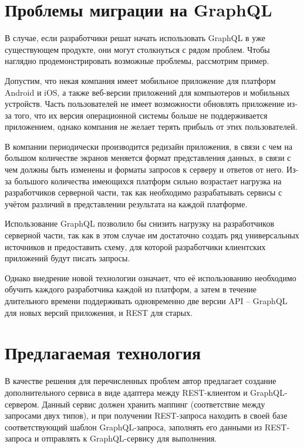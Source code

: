 \section{Проблемы миграции на GraphQL}\label{sec:migration-to-graphql}

В случае, если разработчики решат начать использовать GraphQL в уже существующем продукте, они могут столкнуться с рядом проблем.
Чтобы наглядно продемонстрировать возможные проблемы, рассмотрим пример.

Допустим, что некая компания имеет мобильное приложение для платформ Android и iOS, а также веб-версии приложений для компьютеров и мобильных устройств.
Часть пользователей не имеет возможности обновлять приложение из-за того, что их версия операционной системы больше не поддерживается приложением, однако компания не желает терять прибыль от этих пользователей.

В компании периодически производится редизайн приложения, в связи с чем на большом количестве экранов меняется формат представления данных, в связи с чем должны быть изменены и форматы запросов к серверу и ответов от него.
Из-за большого количества имеющихся платформ сильно возрастает нагрузка на разработчиков серверной части, так как необходимо разрабатывать сервисы с учётом различий в представлении результата на каждой платформе.

Использование GraphQL позволило бы снизить нагрузку на разработчиков серверной части, так как в этом случае им достаточно создать ряд универсальных источников и предоставить схему, для которой разработчики клиентских приложений будут писать запросы.

Однако внедрение новой технологии означает, что её использованию необходимо обучить каждого разработчика каждой из платформ, а затем в течение длительного времени поддерживать одновременно две версии API – GraphQL для новых версий приложения, и REST для старых.


\section{Предлагаемая технология}\label{sec:proposed-technology}

В качестве решения для перечисленных проблем автор предлагает создание дополнительного сервиса в виде адаптера между REST-клиентом и GraphQL-сервером.
Данный сервис должен хранить маппинг (соответствие между запросами двух типов), и при получении REST-запроса находить в своей базе соответствующий шаблон GraphQL-запроса, заполнять его данными из REST-запроса и отправлять к GraphQL-сервису для выполнения.

